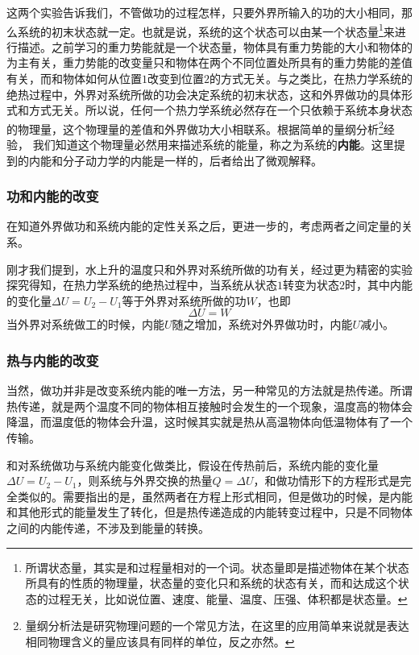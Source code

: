 这两个实验告诉我们，不管做功的过程怎样，只要外界所输入的功的大小相同，那么系统的初末状态就一定。也就是说，系统的这个状态可以由某一个状态量\footnote{所谓状态量，其实是和过程量相对的一个词。状态量即是描述物体在某个状态所具有的性质的物理量，状态量的变化只和系统的状态有关，而和达成这个状态的过程无关，比如说位置、速度、能量、温度、压强、体积都是状态量。}来进行描述。之前学习的重力势能就是一个状态量，物体具有重力势能的大小和物体的为主有关，重力势能的改变量只和物体在两个不同位置处所具有的重力势能的差值有关，而和物体如何从位置$1$改变到位置$2$的方式无关。与之类比，在热力学系统的绝热过程中，外界对系统所做的功会决定系统的初末状态，这和外界做功的具体形式和方式无关。所以说，任何一个热力学系统必然存在一个只依赖于系统本身状态的物理量，这个物理量的差值和外界做功大小相联系。根据简单的量纲分析\footnote{量纲分析法是研究物理问题的一个常见方法，在这里的应用简单来说就是表达相同物理含义的量应该具有同样的单位，反之亦然。}经验，
我们知道这个物理量必然用来描述系统的能量，称之为系统的\textbf{内能}。这里提到的内能和分子动力学的内能是一样的，后者给出了微观解释。

\subsubsection{功和内能的改变}
在知道外界做功和系统内能的定性关系之后，更进一步的，考虑两者之间定量的关系。

刚才我们提到，水上升的温度只和外界对系统所做的功有关，经过更为精密的实验探究得知，在热力学系统的绝热过程中，当系统从状态$1$转变为状态$2$时，其中内能的变化量$\Delta U=U_2-U_1$等于外界对系统所做的功$W$，也即$$\Delta U=W$$当外界对系统做工的时候，内能$U$随之增加，系统对外界做功时，内能$U$减小。

\subsubsection{热与内能的改变}
当然，做功并非是改变系统内能的唯一方法，另一种常见的方法就是热传递。所谓热传递，就是两个温度不同的物体相互接触时会发生的一个现象，温度高的物体会降温，而温度低的物体会升温，这时候其实就是热从高温物体向低温物体有了一个传输。

和对系统做功与系统内能变化做类比，假设在传热前后，系统内能的变化量$\Delta U=U_2-U_1$，则系统与外界交换的热量$Q=\Delta U$，和做功情形下的方程形式是完全类似的。需要指出的是，虽然两者在方程上形式相同，但是做功的时候，是内能和其他形式的能量发生了转化，但是热传递造成的内能转变过程中，只是不同物体之间的内能传递，不涉及到能量的转换。

